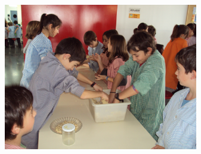 \begin{news}
\noindent\includegraphics[width=8.5cm,keepaspectratio]{parvulari/img/castanyada_DSC01046.JPG}

						
\end{news}
